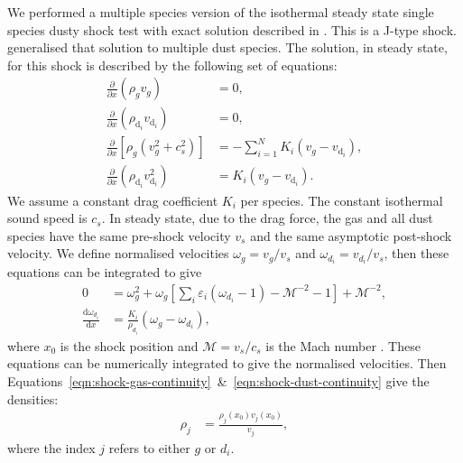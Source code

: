\documentclass[fleqn,usenatbib]{mnras}
\newcommand{\dd}{\mathrm{d}}
\begin{document}
We performed a multiple species version of the isothermal steady state single
species dusty shock test with exact solution described in
\citet{Lehmann2018MNRAS.476.3185L}. This is a J-type shock.
\citet{Benitez-Llambay2019ApJS..241...25B} generalised that solution to multiple
dust species. The solution, in steady state, for this shock is described by the
following set of equations:
%
\begin{align}
   \frac{\partial}{\partial x} \left( \rho_g v_g \right)
      &= 0, \label{eqn:shock-gas-continuity} \\
   \frac{\partial}{\partial x} \left( \rho_{\dd_i} v_{\dd_i} \right)
      &= 0, \label{eqn:shock-dust-continuity} \\
   \frac{\partial}{\partial x} \left[ \rho_g (v_g^2 + c_s^2)\right]
      &= - \sum_{i=1}^N K_i (v_g - v_{\dd_i}), \\
   \frac{\partial}{\partial x} \left( \rho_{\dd_i} v_{\dd_i}^2 \right)
      &= K_i (v_g - v_{\dd_i}).
\end{align}
%
We assume a constant drag coefficient \(K_i\) per species. The constant
isothermal sound speed is \(c_s\). In steady state, due to the drag force, the
gas and all dust species have the same pre-shock velocity \(v_s\) and the same
asymptotic post-shock velocity. We define normalised velocities \(\omega_g = v_g
/ v_s\) and \(\omega_{d_i} = v_{d_i} / v_s\), then these equations can be
integrated to give
%
\begin{align}
   0 &= \omega_g^2 + \omega_g \left[ \sum_i \varepsilon_i (\omega_{d_i} - 1)
      - \mathcal{M}^{-2} -1 \right] + \mathcal{M}^{-2}, \\
   \frac{\dd \omega_{d_i}}{\dd x} &= \frac{K_i}{\rho_{d_i}}
      \left( \omega_g - \omega_{d_i} \right),
\end{align}
%
where \(x_0\) is the shock position and \(\mathcal{M} = v_s / c_s\) is the Mach
number \citep{Benitez-Llambay2019ApJS..241...25B}. These equations can be
numerically integrated to give the normalised velocities. Then
Equations~\ref{eqn:shock-gas-continuity}~\&~\ref{eqn:shock-dust-continuity} give
the densities:
%
\begin{align}
   \rho_j &= \frac{\rho_j(x_0) v_j(x_0)}{v_j},
\end{align}
%
where the index \(j\) refers to either \(g\) or \(d_i\).
\end{document}
